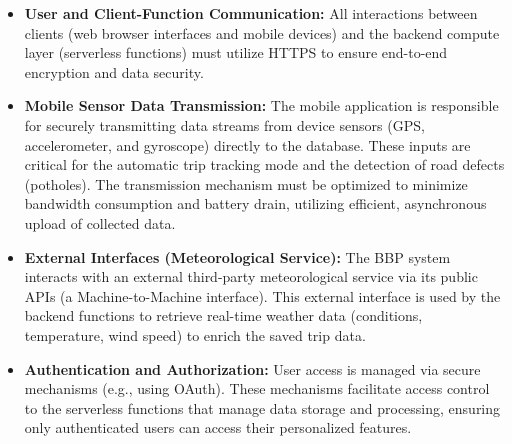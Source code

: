\begin{itemize}
    \item \textbf{User and Client-Function Communication:} All interactions between clients (web browser interfaces and mobile devices) and the backend compute layer (serverless functions) must utilize HTTPS to ensure end-to-end encryption and data security.
    
    \item \textbf{Mobile Sensor Data Transmission:} The mobile application is responsible for securely transmitting data streams from device sensors (GPS, accelerometer, and gyroscope) directly to the database. These inputs are critical for the automatic trip tracking mode and the detection of road defects (potholes). The transmission mechanism must be optimized to minimize bandwidth consumption and battery drain, utilizing efficient, asynchronous upload of collected data.
    
    \item \textbf{External Interfaces (Meteorological Service):} The BBP system interacts with an external third-party meteorological service via its public APIs (a Machine-to-Machine interface). This external interface is used by the backend functions to retrieve real-time weather data (conditions, temperature, wind speed) to enrich the saved trip data.
    
    \item \textbf{Authentication and Authorization:} User access is managed via secure mechanisms (e.g., using OAuth). These mechanisms facilitate access control to the serverless functions that manage data storage and processing, ensuring only authenticated users can access their personalized features.
\end{itemize}